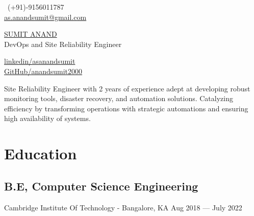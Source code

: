 \documentclass[a4,10pt]{article}
\begin{document}
\begin{center}
    \begin{minipage}[b]{0.24\textwidth}
            \ (+91)-9156011787 \\
            \normalsize \href{mailto:as.anandsumit@gmail.com}{as.anandsumit@gmail.com} 
    \end{minipage}%
    \begin{minipage}[b]{0.5\textwidth}
            \centering
            {\Huge \underline {SUMIT ANAND}} \\ %
            \vspace{0.1cm}
            {\color{UI_blue} \Large{DevOps and Site Reliability Engineer}} \\
    \end{minipage}%
    \begin{minipage}[b]{0.24\textwidth}
            \flushright \normalsize  %
            {\href{https://www.linkedin.com/in/asanandsumit/}{linkedin/asanandsumit} } \\
            \href{https://github.com/anandsumit2000}{GitHub/anandsumit2000}
    \end{minipage}   

    {\color{UI_blue} \hrulefill}
\end{center}

Site Reliability Engineer with 2 years of experience adept at developing robust monitoring tools, disaster recovery, and automation solutions. Catalyzing efficiency by transforming operations with strategic automations and ensuring high availability of systems.  %

\section{Education }

\subsection*{B.E, Computer Science Engineering} 
{{\normalsize \normalfont Cambridge Institute Of Technology - Bangalore, KA} \hfill Aug 2018 --- July 2022} 
\end{document}
